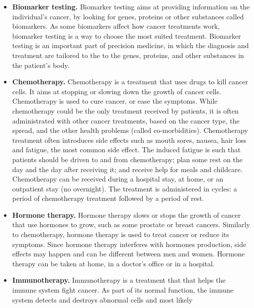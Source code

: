 \begin{itemize}
    \item \textbf{Biomarker testing.} Biomarker testing aims at providing
          information on the individual's cancer, by looking for genes, proteins or
          other substances called biomarkers. As some biomarkers affect how cancer
          treatments work, biomarker testing is a way to choose the most suited
          treatment. Biomarker testing is an important part of precision medicine, in
          which the diagnosis and treatment are tailored to the to the genes,
          proteins, and other substances in the patient's body.
    \item \textbf{Chemotherapy.} Chemotherapy is a treatment that uses drugs to
          kill cancer cells. It aims at stopping or slowing down the growth of
          cancer cells. Chemotherapy is used to cure cancer, or ease the
          symptoms. While chemotherapy could be the only treatment received by
          patients, it is often administrated with other cancer treatments,
          based on the cancer type, the spread, and the other health problems
          (called co-morbidities). Chemotherapy treatment often introduces side
          effects such as mouth sores, nausea, hair loss and fatigue, the most
          common side effect. The induced fatigue is such that patients should
          be driven to and from chemotherapy; plan some rest on the day and the
          day after receiving it; and receive help for meals and childcare.
          Chemotherapy can be received during a hospital stay, at home, or an
          outpatient stay (no overnight). The treatment is administered in
          cycles: a period of chemotherapy treatment followed by a period of
          rest.
    \item \textbf{Hormone therapy.} Hormone therapy slows or stops the growth of
          cancer that use hormones to grow, such as some prostate or breast
          cancers. Similarly to chemotherapy, hormone therapy is used to treat
          cancer or reduce its symptoms. Since hormone therapy interferes
          with hormones production, side effects may happen and can be
          different between men and women. Hormone therapy can be taken at
          home, in a doctor's office or in a hospital.
    \item \textbf{Immunotherapy.} Immunotherapy is a treatment that that helps
          the immune system fight cancer. As part of its normal function, the
          immune system detects and destroys abnormal cells and most likely

\end{itemize}
